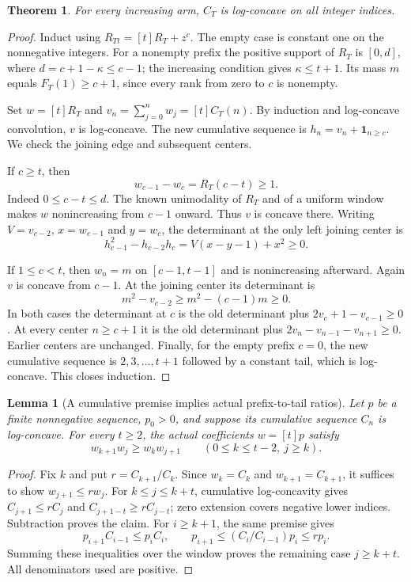 \documentclass[11pt]{article}
\newtheorem{lemma}[proposition]{Lemma}
\newtheorem{theorem}[proposition]{Theorem}
\begin{document}
\begin{theorem}\label{thm:deficit-cumulative-lc}
For every increasing arm, $C_T$ is log-concave on all integer indices.
\end{theorem}
\begin{proof}
Induct using $R_{Tt}=[t]R_T+z^c$. The empty case is constant one
on the nonnegative integers. For a nonempty prefix the positive
support of $R_T$ is $[0,d]$, where $d=c+1-\kappa\le c-1$;
the increasing condition gives $\kappa\le t+1$. Its mass $m$ equals
$F_T(1)\ge c+1$, since every rank from zero to $c$ is nonempty.

Set $w=[t]R_T$ and $v_n=\sum_{j=0}^n w_j=[t]C_T(n)$.
By induction and log-concave convolution, $v$ is log-concave.
The new cumulative sequence is $h_n=v_n+\mathbf1_{n\ge c}$.
We check the joining edge and subsequent centers.

If $c\ge t$, then
\[
 w_{c-1}-w_c=R_T(c-t)\ge1.
\]
Indeed $0\le c-t\le d$. The known unimodality of $R_T$
and of a uniform window makes $w$ nonincreasing from $c-1$
onward. Thus $v$ is concave there. Writing
$V=v_{c-2}$, $x=w_{c-1}$ and $y=w_c$, the determinant at
the only left joining center is
\[
 h_{c-1}^2-h_{c-2}h_c=V(x-y-1)+x^2\ge0.
\]

If $1\le c<t$, then $w_n=m$ on $[c-1,t-1]$ and is
nonincreasing afterward. Again $v$ is concave from $c-1$.
At the joining center its determinant is
\[
 m^2-v_{c-2}\ge m^2-(c-1)m\ge0.
\]
In both cases the determinant at $c$ is the old determinant
plus $2v_c+1-v_{c-1}\ge0$. At every center $n\ge c+1$ it is
the old determinant plus $2v_n-v_{n-1}-v_{n+1}\ge0$.
Earlier centers are unchanged. Finally, for the empty prefix
$c=0$, the new cumulative sequence is $2,3,\ldots,t+1$ followed
by a constant tail, which is log-concave. This closes induction.
\end{proof}

\begin{lemma}[A cumulative premise implies actual prefix-to-tail ratios]
Let $p$ be a finite nonnegative sequence, $p_0>0$, and suppose
its cumulative sequence $C_n$ is log-concave. For every $t\ge2$,
the actual coefficients $w=[t]p$ satisfy
\[
 w_{k+1}w_j\ge w_kw_{j+1}\qquad(0\le k\le t-2,\ j\ge k).
\]
\end{lemma}
\begin{proof}
Fix $k$ and put $r=C_{k+1}/C_k$. Since $w_k=C_k$ and
$w_{k+1}=C_{k+1}$, it suffices to show $w_{j+1}\le rw_j$.
For $k\le j\le k+t$, cumulative log-concavity gives
$C_{j+1}\le rC_j$ and $C_{j+1-t}\ge rC_{j-t}$;
zero extension covers negative lower indices. Subtraction proves
the claim. For $i\ge k+1$, the same premise gives
\[
 p_{i+1}C_{i-1}\le p_iC_i,\qquad
 p_{i+1}\le (C_i/C_{i-1})p_i\le rp_i.
\]
Summing these inequalities over the window proves the remaining
case $j\ge k+t$. All denominators used are positive.
\end{proof}
\end{document}
